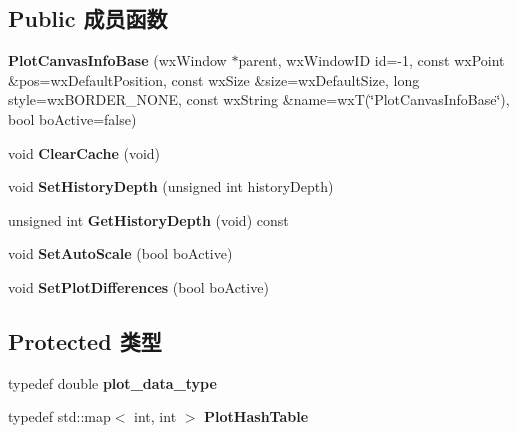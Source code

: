\subsection*{Public 成员函数}
\begin{DoxyCompactItemize}
\item 
\hypertarget{class_plot_canvas_info_base_a935f1356e2ab26137aea5696646f6163}{{\bfseries Plot\+Canvas\+Info\+Base} (wx\+Window $\ast$parent, wx\+Window\+I\+D id=-\/1, const wx\+Point \&pos=wx\+Default\+Position, const wx\+Size \&size=wx\+Default\+Size, long style=wx\+B\+O\+R\+D\+E\+R\+\_\+\+N\+O\+N\+E, const wx\+String \&name=wx\+T(\char`\"{}Plot\+Canvas\+Info\+Base\char`\"{}), bool bo\+Active=false)}\label{class_plot_canvas_info_base_a935f1356e2ab26137aea5696646f6163}

\item 
\hypertarget{class_plot_canvas_info_base_a003bb567205ef99156ce2369723155da}{void {\bfseries Clear\+Cache} (void)}\label{class_plot_canvas_info_base_a003bb567205ef99156ce2369723155da}

\item 
\hypertarget{class_plot_canvas_info_base_a06d73304015fe102a970381f92119a2f}{void {\bfseries Set\+History\+Depth} (unsigned int history\+Depth)}\label{class_plot_canvas_info_base_a06d73304015fe102a970381f92119a2f}

\item 
\hypertarget{class_plot_canvas_info_base_a7fa09da27b03ea0378e87eeed6bc05ee}{unsigned int {\bfseries Get\+History\+Depth} (void) const }\label{class_plot_canvas_info_base_a7fa09da27b03ea0378e87eeed6bc05ee}

\item 
\hypertarget{class_plot_canvas_info_base_a8cef248cefdc38f74074a069c900df01}{void {\bfseries Set\+Auto\+Scale} (bool bo\+Active)}\label{class_plot_canvas_info_base_a8cef248cefdc38f74074a069c900df01}

\item 
\hypertarget{class_plot_canvas_info_base_ac0b9cb1513edb4f95ea82d85d856c292}{void {\bfseries Set\+Plot\+Differences} (bool bo\+Active)}\label{class_plot_canvas_info_base_ac0b9cb1513edb4f95ea82d85d856c292}

\end{DoxyCompactItemize}
\subsection*{Protected 类型}
\begin{DoxyCompactItemize}
\item 
\hypertarget{class_plot_canvas_info_base_ab176c8948d190a6e33d58e614328e794}{typedef double {\bfseries plot\+\_\+data\+\_\+type}}\label{class_plot_canvas_info_base_ab176c8948d190a6e33d58e614328e794}

\item 
\hypertarget{class_plot_canvas_info_base_a510592793a04267522ea992ea9043400}{typedef std\+::map$<$ int, int $>$ {\bfseries Plot\+Hash\+Table}}\label{class_plot_canvas_info_base_a510592793a04267522ea992ea9043400}

\end{DoxyCompactItemize}
